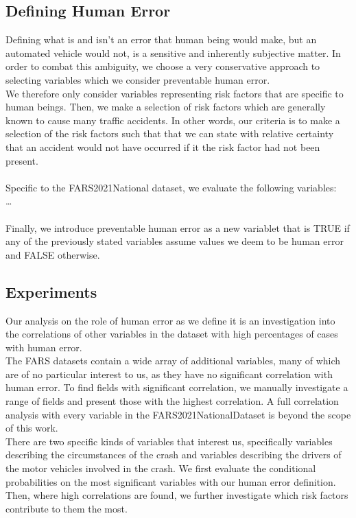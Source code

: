 \documentclass{article}
\theoremstyle{plain}
\theoremstyle{definition}
\theoremstyle{remark}
\begin{document}
\subsection{Defining Human Error}
Defining what is and isn't an error that human being would make, but an automated vehicle would not, is a sensitive and inherently subjective matter. In order to combat this ambiguity, we choose a very conservative approach to selecting variables which we consider preventable human error.\\
We therefore only consider variables representing risk factors that are specific to human beings. Then, we make a selection of risk factors which are generally known to cause many traffic accidents. In other words, our criteria is to make a selection of the risk factors such that that we can state with relative certainty that an accident would not have occurred if it the risk factor had not been present.\\
\\
Specific to the FARS2021National dataset, we evaluate the following variables:\\
\ldots \\
\\
Finally, we introduce preventable human error as a new variablet that is TRUE if any of the previously stated variables assume values we deem to be human error and FALSE otherwise.

\subsection{Experiments}
Our analysis on the role of human error as we define it is an investigation into the correlations of other variables in the dataset with high percentages of cases with human error.\\
The FARS datasets contain a wide array of additional variables, many of which are of no particular interest to us, as they have no significant correlation with human error. To find fields with significant correlation, we manually investigate a range of fields and present those with the highest correlation. A full correlation analysis with every variable in the FARS2021NationalDataset is beyond the scope of this work.\\
There are two specific kinds of variables that interest us, specifically variables describing the circumstances of the crash and variables describing the drivers of the motor vehicles involved in the crash. We first evaluate the conditional probabilities on the most significant variables with our human error definition. Then, where high correlations are found, we further investigate which risk factors contribute to them the most.
\end{document}
